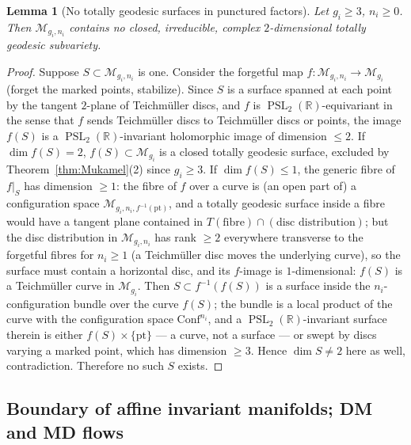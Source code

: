 \documentclass[11pt]{article}
\newcommand{\R}{\mathbb{R}}
\newcommand{\M}{\mathcal{M}}
\DeclareMathOperator{\PSL}{PSL}
\newtheorem{lem}[thm]{Lemma}
\theoremstyle{definition}
\theoremstyle{remark}
\begin{document}
\begin{lem}[No totally geodesic surfaces in punctured
factors]\label{lem:membership-exclusion}
Let $g_i \ge 3$, $n_i \ge 0$. Then $\M_{g_i,n_i}$ contains no closed,
irreducible, complex $2$-dimensional totally geodesic subvariety.
\end{lem}

\begin{proof}
Suppose $S \subset \M_{g_i,n_i}$ is one. Consider the forgetful map
$f : \M_{g_i,n_i} \to \M_{g_i}$ (forget the marked points, stabilize).
Since $S$ is a surface spanned at each point by the tangent
$2$-plane of Teichm\"uller discs, and $f$ is $\PSL_2(\R)$-equivariant
in the sense that $f$ sends Teichm\"uller discs to Teichm\"uller discs
or points, the image $f(S)$ is a $\PSL_2(\R)$-invariant holomorphic
image of dimension $\le 2$. If $\dim f(S) = 2$, $f(S) \subset
\M_{g_i}$ is a closed totally geodesic surface, excluded by
Theorem~\ref{thm:Mukamel}(2) since $g_i \ge 3$.
If $\dim f(S) \le 1$, the generic fibre of $f|_S$ has dimension
$\ge 1$: the fibre of $f$ over a curve is (an open part of) a
configuration space $\M_{g_i,n_i,f^{-1}(\mathrm{pt})}$, and a
totally geodesic surface inside a fibre would have a tangent plane
contained in $T(\text{fibre}) \cap (\text{disc distribution})$; but
the disc distribution in $\M_{g_i,n_i}$ has rank $\ge 2$ everywhere
transverse to the forgetful fibres for $n_i \ge 1$ (a Teichm\"uller
disc moves the underlying curve), so the surface must contain a
horizontal disc, and its $f$-image is $1$-dimensional: $f(S)$ is a
Teichm\"uller curve in $\M_{g_i}$. Then $S \subset
f^{-1}(f(S))$ is a surface inside the $n_i$-configuration bundle over
the curve $f(S)$; the bundle is a local product of the curve with the
configuration space $\mathrm{Conf}^{n_i}$, and a $\PSL_2(\R)$-invariant
surface therein is either $f(S) \times \{\mathrm{pt}\}$ --- a curve, not
a surface --- or swept by discs varying a marked point, which has
dimension $\ge 3$. Hence $\dim S \neq 2$ here as well, contradiction.
Therefore no such $S$ exists.
\end{proof}

\subsection{Boundary of affine invariant manifolds; DM and MD flows}
\end{document}

